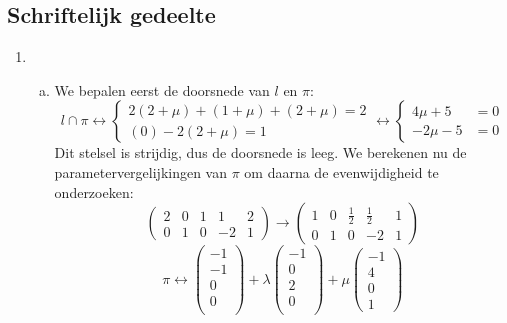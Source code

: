 \documentclass[main.tex]{subfiles}
\begin{document}
\subsection*{Schriftelijk gedeelte}
\begin{enumerate}
\item 
  \begin{enumerate}[(a)]
  \item
    We bepalen eerst de doorsnede van $l$ en $\pi$:
    \[
    l \cap \pi \leftrightarrow
    \left\{
    \begin{array}{c}
      2(2+\mu) + (1+\mu) + (2+\mu) = 2\\
      (0) - 2(2+\mu) = 1
    \end{array}
    \right.
    \leftrightarrow
    \left\{
      \begin{array}{rl}
        4\mu+5 &= 0\\
        -2\mu-5 &= 0
      \end{array}
    \right.
    \]
    Dit stelsel is strijdig, dus de doorsnede is leeg.
    We berekenen nu de parametervergelijkingen van $\pi$ om daarna de evenwijdigheid te onderzoeken:
    \[ 
    \left(
      \begin{array}{cccc|c}
        2 & 0 & 1 & 1 & 2\\
        0 & 1 & 0 & -2 & 1
      \end{array}
    \right)
    \rightarrow
    \left(
      \begin{array}{cccc|c}
        1 & 0 & \frac{1}{2} & \frac{1}{2} & 1\\
        0 & 1 & 0 & -2 & 1
      \end{array}
    \right)
    \]
    \[ \pi \leftrightarrow 
    \begin{pmatrix}
      -1\\ -1\\ 0\\ 0\\
    \end{pmatrix}
    +\lambda
    \begin{pmatrix}
      -1\\0\\2\\0\\
    \end{pmatrix}
    +\mu
    \begin{pmatrix}
      -1\\ 4\\ 0\\ 1
    \end{pmatrix}
\]
\end{enumerate}
\end{enumerate}
\end{document}
